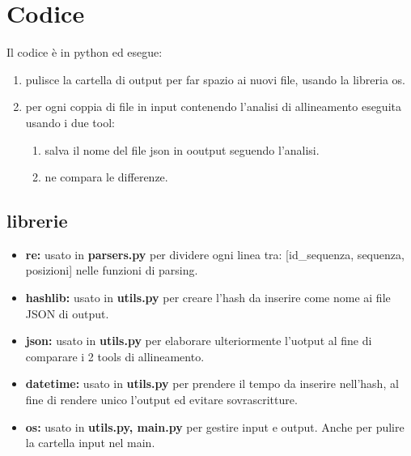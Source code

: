 \documentclass[11pt,italian]{article}
\begin{document}
\section{Codice}
Il codice è in python ed esegue:
\begin{enumerate}
  \item pulisce la cartella di output per far spazio ai nuovi file, usando la libreria os.
  \item per ogni coppia di file in input contenendo l'analisi di allineamento eseguita usando i due tool:
  \begin{enumerate}
    \item salva il nome del file json in ooutput seguendo l'analisi.
    \item ne compara le differenze.
  \end{enumerate}
\end{enumerate}

\subsection{librerie}
\begin{itemize}
  \item\textbf{re:} usato in \textbf{parsers.py} per dividere ogni linea tra: [id\_sequenza, sequenza, posizioni] nelle funzioni di parsing.
  \item\textbf{hashlib:} usato in \textbf{utils.py} per creare l'hash da inserire come nome ai file JSON di output.
  \item\textbf{json:} usato in \textbf{utils.py} per elaborare ulteriormente l'uotput al fine di comparare i 2 tools di allineamento.
  \item\textbf{datetime:} usato in \textbf{utils.py} per prendere il tempo da inserire nell'hash, al fine di rendere unico l'output ed evitare sovrascritture.
  \item\textbf{os:} usato in \textbf{utils.py, main.py} per gestire input e output. Anche per pulire la cartella input nel main.
\end{itemize}
\end{document}
